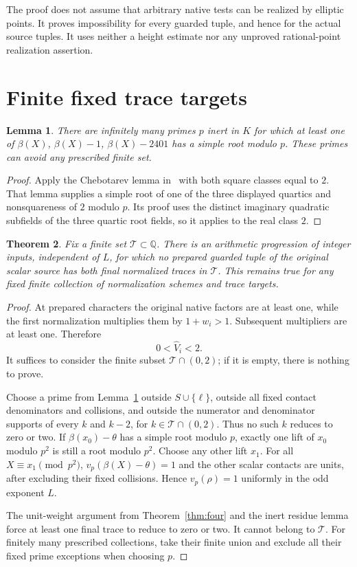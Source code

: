 \documentclass[11pt,a4paper]{article}
\newtheorem{theorem}{Theorem}[section]
\newtheorem{lemma}[theorem]{Lemma}
\newcommand{\Q}{\mathbb Q}\newcommand{\Z}{\mathbb Z}
\begin{document}
The proof does not assume that arbitrary native tests can be realized
by elliptic points. It proves impossibility for every guarded tuple,
and hence for the actual source tuples. It uses neither a height
estimate nor any unproved rational-point realization assertion.

\section{Finite fixed trace targets}

\begin{lemma}\label{lem:primes}
There are infinitely many primes $p$ inert in $K$ for which at least
one of $\beta(X)$, $\beta(X)-1$, $\beta(X)-2401$ has a simple root
modulo $p$. These primes can avoid any prescribed finite set.
\end{lemma}
\begin{proof}
Apply the Chebotarev lemma in~\cite[Section 4]{Finite} with both
square classes equal to $2$. That lemma supplies a simple root of
one of the three displayed quartics and nonsquareness of $2$ modulo
$p$. Its proof uses the distinct imaginary quadratic subfields of the
three quartic root fields, so it applies to the real class $2$.
\end{proof}

\begin{theorem}\label{thm:finite}
Fix a finite set $\mathcal T\subset\Q$. There is an arithmetic
progression of integer inputs, independent of $L$, for which no
prepared guarded tuple of the original scalar source has both
final normalized traces in $\mathcal T$. This remains true for any
fixed finite collection of normalization schemes and trace targets.
\end{theorem}
\begin{proof}
At prepared characters the original native factors are at least one,
while the first normalization multiplies them by $1+w_i>1$.
Subsequent multipliers are at least one. Therefore
\[
                         0<\widehat V_i<2.
\]
It suffices to consider the finite subset
$\mathcal T\cap(0,2)$; if it is empty, there is nothing to prove.

Choose a prime from Lemma~\ref{lem:primes} outside $S\cup\{\ell\}$, outside all
fixed contact denominators and collisions, and outside the numerator
and denominator supports of every $k$ and $k-2$, for
$k\in\mathcal T\cap(0,2)$. Thus no such $k$ reduces to zero or two.
If $\beta(x_0)-\theta$ has a simple root modulo $p$, exactly one
lift of $x_0$ modulo $p^2$ is still a root modulo $p^2$. Choose any
other lift $x_1$. For all $X\equiv x_1\pmod{p^2}$,
$v_p(\beta(X)-\theta)=1$ and the other scalar contacts are units,
after excluding their fixed collisions. Hence $v_p(\rho)=1$
uniformly in the odd exponent $L$.

The unit-weight argument from Theorem~\ref{thm:four} and the inert
residue lemma force at least one final trace to reduce to zero or two.
It cannot belong to $\mathcal T$. For finitely many prescribed
collections, take their finite union and exclude all their fixed
prime exceptions when choosing $p$.
\end{proof}
\end{document}

